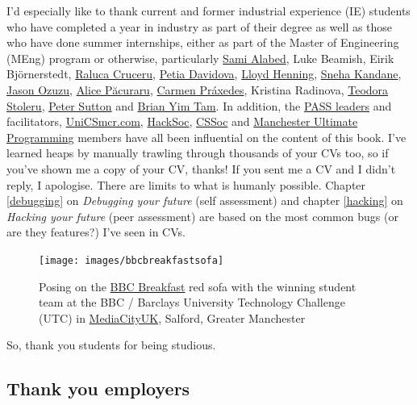 \documentclass[
]{book}
\begin{document}
I'd especially like to thank current and former industrial experience (IE) students who have completed a year in industry as part of their degree as well as those who have done summer internships, either as part of the Master of Engineering (MEng) program or otherwise, particularly \href{https://github.com/samialabed}{Sami Alabed}, Luke Beamish, Eirik Björnerstedt, \href{https://www.cdyf.me/raluca}{Raluca Cruceru}, \href{https://www.youtube.com/channel/UCDmn8CxaXGxZSKq83vhzULw}{Petia Davidova}, \href{https://github.com/eldog}{Lloyd Henning}, \href{https://www.cdyf.me/sneha}{Sneha Kandane}, \href{https://www.cdyf.me/jason}{Jason Ozuzu}, \href{https://www.cdyf.me/alice}{Alice Păcuraru}, \href{https://www.cdyf.me/carmen}{Carmen Práxedes}, Kristina Radinova, \href{https://github.com/teostoleru}{Teodora Stoleru}, \href{https://github.com/dj-foxxy}{Peter Sutton} and \href{https://www.cdyf.me/brian}{Brian Yim Tam}. In addition, the \href{http://www.pass.manchester.ac.uk}{PASS leaders} and facilitators, \href{https://unicsmcr.com/}{UniCSmcr.com}, \href{https://github.com/unicsmcr/hacksoc.com}{HackSoc}, \href{https://github.com/cssoc}{CSSoc} and \href{https://github.com/Man-UP}{Manchester Ultimate Programming} members have all been influential on the content of this book. I've learned heaps by manually trawling through thousands of your CVs too, so if you've shown me a copy of your CV, thanks! If you sent me a CV and I didn't reply, I apologise. There are limits to what is humanly possible. Chapter \ref{debugging} on \emph{Debugging your future} (self assessment) and chapter \ref{hacking} on \emph{Hacking your future} (peer assessment) are based on the most common bugs (or are they features?) I've seen in CVs.

\begin{figure}

{\centering \texttt{[image: images/bbcbreakfastsofa]} 

}

\caption{Posing on the \href{https://en.wikipedia.org/wiki/BBC_Breakfast}{BBC Breakfast} red sofa with the winning student team at the BBC / Barclays University Technology Challenge (UTC) in \href{https://en.wikipedia.org/wiki/MediaCityUK}{MediaCityUK}, Salford, Greater Manchester}\label{fig:unnamed-chunk-3}
\end{figure}



So, thank you students for being studious. 🙏

\hypertarget{employers}{%
\subsection{Thank you employers}\label{employers}}
\end{document}
